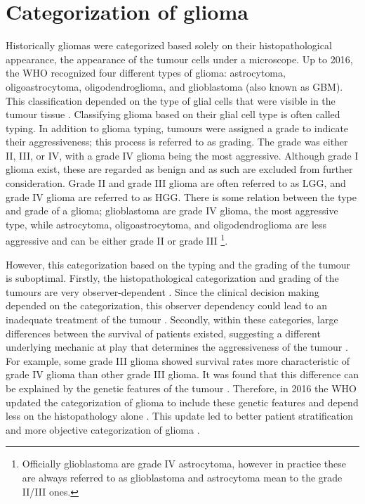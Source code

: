 \section{Categorization of glioma}
Historically gliomas were categorized based solely on their histopathological appearance, the appearance of the tumour cells under a microscope.
Up to 2016, the \gls{WHO} recognized four different types of glioma: astrocytoma, oligoastrocytoma, oligodendroglioma, and glioblastoma (also known as \gls{GBM}).
This classification depended on the type of glial cells that were visible in the tumour tissue \autocite{louis2007who}.
Classifying glioma based on their glial cell type is often called typing.
In addition to glioma typing, tumours were assigned a grade to indicate their aggressiveness; this process is referred to as grading.
The grade was either II, III, or IV, with a grade IV glioma being the most aggressive.
Although grade I glioma exist, these are regarded as benign and as such are excluded from further consideration.
Grade II and grade III glioma are often referred to as \gls{LGG}, and grade IV glioma are referred to as \gls{HGG}.
There is some relation between the type and grade of a glioma; glioblastoma are grade IV glioma, the most aggressive type, while astrocytoma, oligoastrocytoma, and oligodendroglioma are less aggressive and can be either grade II or grade III \footnote{Officially glioblastoma are grade IV astrocytoma, however in practice these are always referred to as glioblastoma and astrocytoma mean to the grade II/III ones.}.

However, this categorization based on the typing and the grading of the tumour is suboptimal.
Firstly, the histopathological categorization and grading of the tumours are very observer-dependent \autocite{mittler1996gradingreliability, vandenbent2010interobserver}.
Since the clinical decision making depended on the categorization, this observer dependency could lead to an inadequate treatment of the tumour \autocite{vandenbent2010interobserver}.
Secondly, within these categories, large differences between the survival of patients existed, suggesting a different underlying mechanic at play that determines the aggressiveness of the tumour \autocite{dubbink2015molecular}.
For example, some grade III glioma showed survival rates more characteristic of grade IV glioma than other grade III glioma.
It was found that this difference can be explained by the genetic features of the tumour \autocite{dubbink2015molecular,eckel2015gliomagroups}.
Therefore, in 2016 the \gls{WHO} updated the categorization of glioma to include these genetic features and depend less on the histopathology alone \cite{louis20162016}.
This update led to better patient stratification and more objective categorization of glioma \autocite{molinaro2019geneticepidemiology}.

